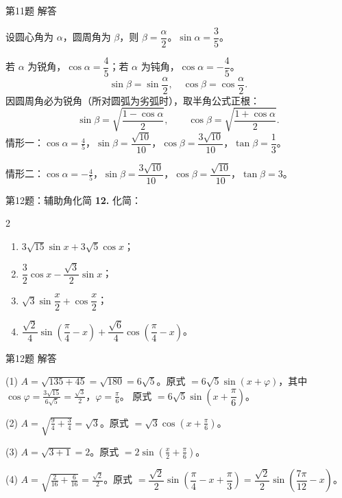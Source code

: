 \documentclass[10pt,aspectratio=169,serif]{beamer}
\begin{document}
\begin{frame}[t]{第11题 解答}
\begin{tcolorbox}[colback=orange!10,colframe=orange,title=\textbf{解}]
设圆心角为 $\alpha$，圆周角为 $\beta$，则 $\beta=\dfrac{\alpha}{2}$。$\sin\alpha=\dfrac35$。

若 $\alpha$ 为锐角，$\cos\alpha=\dfrac45$；若 $\alpha$ 为钝角，$\cos\alpha=-\dfrac45$。
\[
\sin\beta=\sin\frac{\alpha}{2},\quad \cos\beta=\cos\frac{\alpha}{2}.
\]
因圆周角必为锐角（所对圆弧为劣弧时），取半角公式正根：
\[
\sin\beta=\sqrt{\frac{1-\cos\alpha}{2}},\qquad \cos\beta=\sqrt{\frac{1+\cos\alpha}{2}}.
\]
\alert{情形一：$\cos\alpha=\frac45$}，$\sin\beta=\dfrac{\sqrt{10}}{10}$，$\cos\beta=\dfrac{3\sqrt{10}}{10}$，$\tan\beta=\dfrac13$。

\alert{情形二：$\cos\alpha=-\frac45$}，$\sin\beta=\dfrac{3\sqrt{10}}{10}$，$\cos\beta=\dfrac{\sqrt{10}}{10}$，$\tan\beta=3$。
\end{tcolorbox}
\end{frame}

\begin{frame}[t]{第12题：辅助角化简}
\textbf{12.} 化简：
\begin{multicols}{2}
\begin{enumerate}
  \item $3\sqrt{15}\sin x+3\sqrt5\cos x$；
  \item $\dfrac32\cos x-\dfrac{\sqrt3}{2}\sin x$；
  \item $\sqrt3\sin\dfrac{x}{2}+\cos\dfrac{x}{2}$；
  \item $\dfrac{\sqrt2}{4}\sin\!\left(\dfrac{\pi}{4}-x\right)+\dfrac{\sqrt6}{4}\cos\!\left(\dfrac{\pi}{4}-x\right)$。
\end{enumerate}
\end{multicols}
\end{frame}

\begin{frame}[t]{第12题 解答}
\begin{tcolorbox}[colback=orange!10,colframe=orange,title=\textbf{解}]
(1) $A=\sqrt{135+45}=\sqrt{180}=6\sqrt5$。原式 $=6\sqrt5\sin(x+\varphi)$，其中 $\cos\varphi=\frac{3\sqrt{15}}{6\sqrt5}=\frac{\sqrt3}{2}$，$\varphi=\frac{\pi}{6}$。
原式 $=6\sqrt5\sin\!\left(x+\dfrac{\pi}{6}\right)$。

(2) $A=\sqrt{\frac94+\frac34}=\sqrt3$。原式 $=\sqrt3\cos\!\left(x+\frac{\pi}{6}\right)$。

(3) $A=\sqrt{3+1}=2$。原式 $=2\sin\!\left(\frac{x}{2}+\frac{\pi}{6}\right)$。

(4) $A=\sqrt{\frac{2}{16}+\frac{6}{16}}=\frac{\sqrt2}{2}$。原式 $=\dfrac{\sqrt2}{2}\sin\!\left(\dfrac{\pi}{4}-x+\dfrac{\pi}{3}\right)=\dfrac{\sqrt2}{2}\sin\!\left(\dfrac{7\pi}{12}-x\right)$。
\end{tcolorbox}
\end{frame}
\end{document}
